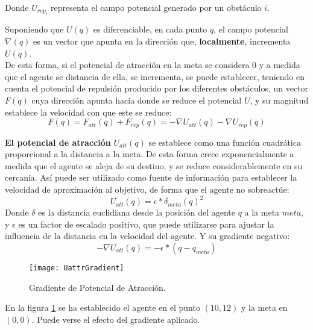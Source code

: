 Donde $U_{rep_i}$ representa el campo potencial generado por un obstáculo $i$.

Suponiendo que $U(q)$ es diferenciable, en cada punto $q$, el campo potencial $\nabla(q)$ es un vector que apunta en la dirección que, \textbf{localmente}, incrementa $U(q)$. \\De esta forma, si el potencial de atracción en la meta se considera 0 y a medida que el agente se distancia de ella, se incrementa, se puede establecer, teniendo en cuenta el potencial de repulsión producido por los diferentes obstáculos, un vector $F(q)$ cuya dirección apunta hacia donde se reduce el potencial $U$, y su magnitud establece la velocidad con que este se reduce:
\begin{equation}
F(q) = F_{att}(q) + F_{rep}(q) = -\nabla U_{att}(q) - \nabla U_{rep}(q)
\label{equation:Fq}
\end{equation}


\textbf{El potencial de atracción} $U_{att}(q)$ se establece como una función cuadrática proporcional a la distancia a la meta. De esta forma crece exponencialmente a medida que el agente se aleja de su destino, y se reduce considerablemente en su cercanía. Así puede ser utilizado como fuente de información para establecer la velocidad de aproximación al objetivo, de forma que el agente no sobreactúe:
\begin{equation}
U_{att}(q) = \epsilon * \delta_{meta}(q)^2
\label{equation:Uatt}
\end{equation}
Donde $\delta$ es la distancia euclidiana desde la posición del agente $q$ a la meta $meta$, y $\epsilon$ es un factor de escalado positivo, que puede utilizarse para ajustar la influencia de la distancia en la velocidad del agente. Y su gradiente negativo: 
\begin{equation}
-\nabla U_{att}(q) = -\epsilon * (q - q_{meta})
\label{equation:dUatt}
\end{equation}
\begin{figure}[H]
	\centering
	\texttt{[image: UattrGradient]}
	\caption{Gradiente de Potencial de Atracción.}\label{fig:uattrgrad}
\end{figure}

En la figura \ref{fig:uattrgrad} se ha establecido el agente en el punto $(10,12)$ y la meta en $(0,0)$. Puede verse el efecto del gradiente aplicado.

